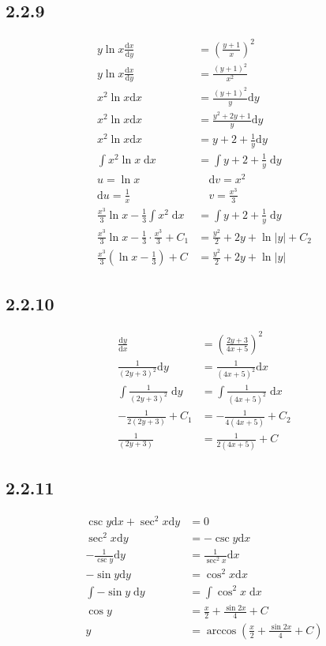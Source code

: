 \documentclass{article}
\begin{document}
\newpage
\subsection{2.2.9}
\begin{align*}
    y\ln x \frac{\mathrm{d}x}{\mathrm{d}y} &= \left(\frac{y+1}{x}\right)^2 \\
    y\ln x \frac{\mathrm{d}x}{\mathrm{d}y} &= \frac{\left(y+1\right)^2}{x^2}\\
    x^2 \ln x \mathrm{d}x  &=  \frac{(y+1)^2}{y}\mathrm{d}y \\
    x^2 \ln x \mathrm{d}x  &=  \frac{y^2+2y+1}{y}\mathrm{d}y \\
    x^2 \ln x \mathrm{d}x  &=  y+2+\frac{1}{y}\mathrm{d}y \\
    \int x^2 \ln x \; \mathrm{d}x  &= \int y+2+\frac{1}{y} \; \mathrm{d}y \\
    u  = \ln x \quad & \quad \mathrm{d}v = x^2 \\
    \mathrm{d}u = \frac{1}{x} \quad & \quad v  = \frac{x^3}{3} \\ 
   \frac{x^3}{3}\ln x-\frac{1}{3} \int x^2  \; \mathrm{d}x  &= \int y+2+\frac{1}{y} \; \mathrm{d}y \\
   \frac{x^3}{3}\ln x-\frac{1}{3} \cdot \frac{x^3}{3} +C_1 &= \frac{y^2}{2}+2y+\ln|y| +C_2 \\
   \frac{x^3}{3}\left(\ln x-\frac{1}{3}\right)+C  &= \frac{y^2}{2}+2y+\ln |y|
\end{align*}

\subsection{2.2.10}
\begin{align*}
    \frac{\mathrm{d}y}{\mathrm{d}x} &= \left(\frac{2y+3}{4x+5}\right)^2 \\
    \frac{1}{(2y+3)^2}\mathrm{d}y &= \frac{1}{(4x+5)^2}\mathrm{d}x \\
    \int \frac{1}{(2y+3)^2} \; \mathrm{d}y &= \int \frac{1}{(4x+5)^2} \; \mathrm{d}x\\
    -\frac{1}{2(2y+3)}+C_1 &= -\frac{1}{4(4x+5)} +C_2\\
    \frac{1}{(2y+3)} &= \frac{1}{2(4x+5)} +C
\end{align*}

\subsection{2.2.11}
\begin{align*}
    \csc y \mathrm{d}x+\sec^2x\mathrm{d}y &= 0\\
    \sec^2x\mathrm{d}y &= -\csc y \mathrm{d}x\\
    -\frac{1}{\csc y}\mathrm{d}y  &= \frac{1}{\sec^2x}\mathrm{d}x\\
    -\sin y \mathrm{d}y &= \cos ^2x\mathrm{d}x\\
    \int -\sin y \; \mathrm{d}y &= \int \cos ^2x \; \mathrm{d}x\\
    \cos y &= \frac{x}{2}+\frac{\sin 2x}{4}+C\\
     y &= \arccos\left( \frac{x}{2}+\frac{\sin 2x}{4}+C\right)
\end{align*}
\end{document}
